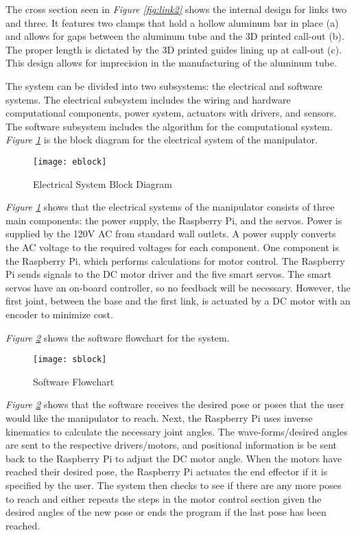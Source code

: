 The cross section seen in \emph{Figure \ref{fig:link2}} shows the internal design for links two and three. It features two clamps that hold a hollow aluminum bar in place (a) and allows for gaps between the aluminum tube and the 3D printed call-out (b). The proper length is dictated by the 3D printed guides lining up at call-out (c). This design allows for imprecision in the manufacturing of the aluminum tube.

The system can be divided into two subsystems: the electrical and software systems. The electrical subsystem includes the wiring and hardware computational components, power system, actuators with drivers, and sensors. The software subsystem includes the algorithm for the computational system.
\emph{Figure \ref{fig:eblock}} is the block diagram for the electrical system of the manipulator.

\begin{figure}[htp]
  \centering
  \texttt{[image: eblock]}
  \caption{Electrical System Block Diagram}
  \label{fig:eblock}
\end{figure}

\emph{Figure \ref{fig:eblock}} shows that the electrical systems of the manipulator consists of three main components: the power supply, the Raspberry Pi, and the servos. Power is supplied by the 120V AC from standard wall outlets. A power supply converts the AC voltage to the required voltages for each component. One component is the Raspberry Pi, which performs calculations for motor control. The Raspberry Pi sends signals to the DC motor driver and the five smart servos. The smart servos have an on-board controller, so no feedback will be necessary. However, the first joint, between the base and the first link, is actuated by a DC motor with an encoder to minimize cost.

\emph{Figure \ref{fig:sblock}} shows the software flowchart for the system.
\begin{figure}[ht]
  \centering
  \texttt{[image: sblock]}
  \caption{Software Flowchart}
  \label{fig:sblock}
\end{figure}

\emph{Figure \ref{fig:sblock}} shows that the software receives the desired pose or poses that the user would like the manipulator to reach. Next, the Raspberry Pi uses inverse kinematics to calculate the necessary joint angles. The wave-forms/desired angles are sent to the respective drivers/motors, and positional information is be sent back to the Raspberry Pi to adjust the DC motor angle. When the motors have reached their desired pose, the Raspberry Pi actuates the end effector if it is specified by the user. The system then checks to see if there are any more poses to reach and either repeats the steps in the motor control section given the desired angles of the new pose or ends the program if the last pose has been reached.

